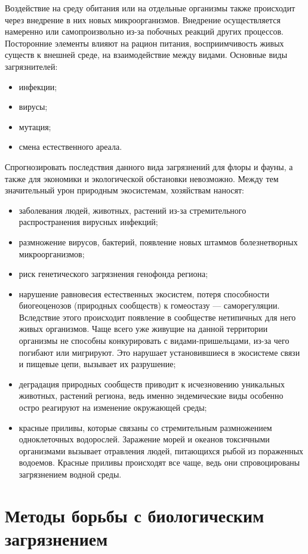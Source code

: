 \documentclass[a4paper, 12pt]{extarticle}
\begin{document}
Воздействие на среду обитания или на отдельные организмы также происходит через внедрение в них новых микроорганизмов. Внедрение осуществляется намеренно или самопроизвольно из-за побочных реакций других процессов. Посторонние элементы влияют на рацион питания, восприимчивость живых существ к внешней среде, на взаимодействие между видами. Основные виды загрязнителей:
\begin{itemize}
    \item инфекции;
    \item вирусы;
    \item мутация;
    \item смена естественного ареала.
\end{itemize}

Спрогнозировать последствия данного вида загрязнений для флоры и фауны, а также для экономики и экологической обстановки невозможно. Между тем значительный урон природным экосистемам, хозяйствам наносят:
\begin{itemize}
    \item заболевания людей, животных, растений из-за стремительного распространения вирусных инфекций;
    \item размножение вирусов, бактерий, появление новых штаммов болезнетворных микроорганизмов;
    \item риск генетического загрязнения генофонда региона;
    \item нарушение равновесия естественных экосистем, потеря способности биогеоценозов (природных сообществ) к гомеостазу — саморегуляции. Вследствие этого происходит появление в сообществе нетипичных для него живых организмов. Чаще всего уже живущие на данной территории организмы не способны конкурировать с видами-пришельцами, из-за чего погибают или мигрируют. Это нарушает установившиеся в экосистеме связи и пищевые цепи, вызывает их разрушение;
    \item деградация природных сообществ приводит к исчезновению уникальных животных, растений региона, ведь именно эндемические виды особенно остро реагируют на изменение окружающей среды;
    \item красные приливы, которые связаны со стремительным размножением одноклеточных водорослей. Заражение морей и океанов токсичными организмами вызывает отравления людей, питающихся рыбой из пораженных водоемов. Красные приливы происходят все чаще, ведь они спровоцированы загрязнением водной среды.
\end{itemize}

\section{Методы борьбы с биологическим загрязнением}
\end{document}
